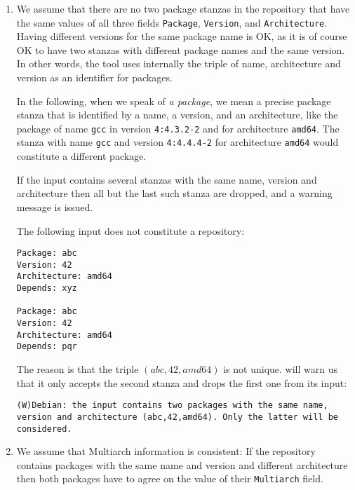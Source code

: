\begin{enumerate}
\item
  We assume that there are no two package stanzas in the repository
  that have the same values of all three fields \texttt{Package},
  \texttt{Version}, and \texttt{Architecture}. Having different
  versions for the same package name is OK, as it is of course OK to
  have two stanzas with different package names and the same version.
  In other words, the \debcheck{} tool uses internally the triple of
  name, architecture and version as an identifier for packages.

  In the following, when we speak of \emph{a package}, we mean a
  precise package stanza that is identified by a name, a version, and
  an architecture, like the package of name \texttt{gcc} in version
  \texttt{4:4.3.2-2} and for architecture \texttt{amd64}. The stanza with name
  \texttt{gcc} and version \texttt{4:4.4.4-2} for architecture
  \texttt{amd64} would constitute a different package.

  If the input contains several stanzas with the same name, version
  and architecture then all but the last such stanza are dropped, and a 
  warning message is issued.

\begin{example} The following input does not constitute a repository:
\begin{verbatim}
Package: abc
Version: 42
Architecture: amd64
Depends: xyz

Package: abc
Version: 42
Architecture: amd64
Depends: pqr
\end{verbatim}
The reason is that the triple $(abc,42,amd64)$ is not
unique. \debcheck{} will warn us that it only accepts the second
stanza and drops the first one from its input:
\begin{verbatim}
(W)Debian: the input contains two packages with the same name, version and architecture (abc,42,amd64). Only the latter will be considered.
\end{verbatim}
\end{example}

\item
  We assume that Multiarch information is consistent: If the
  repository contains packages with the same name and version and
  different architecture then both packages have to agree on the value
  of their \texttt{Multiarch} field.

\end{enumerate}


